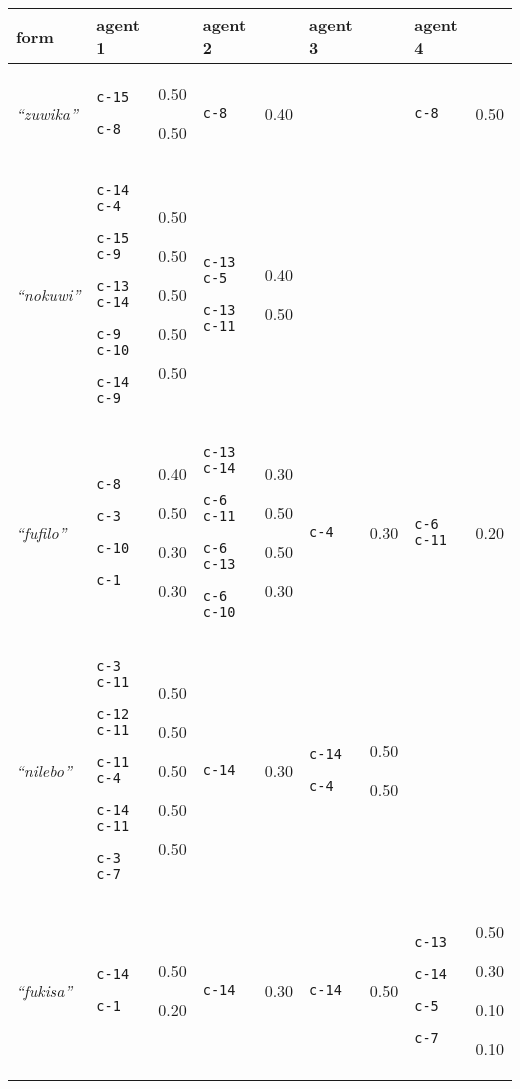 
{\renewcommand{\arraystretch}{1.5}
\begin{tabular}{@{}p{1.2cm}|p{1.6cm}@{}p{0.8cm}@{}|p{1.6cm}@{}p{0.8cm}@{}|p{1.6cm}@{}p{0.8cm}@{}|p{1.6cm}@{}p{0.8cm}@{}}
form & agent 1 &  & agent 2 &  & agent 3 &  & agent 4 & \\
\hline
\textit{``zuwika''}&\texttt{c-15}


\texttt{c-8}
&0.50

0.50&\texttt{c-8}
&0.40&&&\texttt{c-8}
&0.50\\
\hline
\textit{``nokuwi''}&\texttt{c-14 c-4}


\texttt{c-15 c-9}


\texttt{c-13 c-14}


\texttt{c-9 c-10}


\texttt{c-14 c-9}
&0.50

0.50

0.50

0.50

0.50&\texttt{c-13 c-5}


\texttt{c-13 c-11}
&0.40

0.50&&&&\\
\hline
\textit{``fufilo''}&\texttt{c-8}


\texttt{c-3}


\texttt{c-10}


\texttt{c-1}
&0.40

0.50

0.30

0.30&\texttt{c-13 c-14}


\texttt{c-6 c-11}


\texttt{c-6 c-13}


\texttt{c-6 c-10}
&0.30

0.50

0.50

0.30&\texttt{c-4}
&0.30&\texttt{c-6 c-11}
&0.20\\
\hline
\textit{``nilebo''}&\texttt{c-3 c-11}


\texttt{c-12 c-11}


\texttt{c-11 c-4}


\texttt{c-14 c-11}


\texttt{c-3 c-7}
&0.50

0.50

0.50

0.50

0.50&\texttt{c-14}
&0.30&\texttt{c-14}


\texttt{c-4}
&0.50

0.50&&\\

\hline
\textit{``fukisa''}&\texttt{c-14}


\texttt{c-1}
&0.50

0.20&\texttt{c-14}
&0.30&\texttt{c-14}
&0.50&\texttt{c-13}


\texttt{c-14}


\texttt{c-5}


\texttt{c-7}
&0.50

0.30

0.10

0.10
\end{tabular}}
